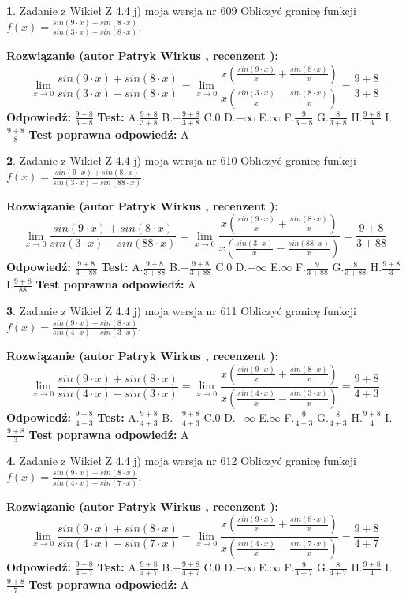 \documentclass[12pt, a4paper]{article}
\theoremstyle{definition} %
\newtheorem{zad}{}
\newcommand{\zadStart}[1]{\begin{zad}#1\newline}
\newcommand{\zadStop}{\end{zad}}
\newcommand{\rozwStart}[2]{\noindent \textbf{Rozwiązanie (autor #1 , recenzent #2): }\newline}
\newcommand{\rozwStop}{\newline}
\newcommand{\odpStart}{\noindent \textbf{Odpowiedź:}\newline}
\newcommand{\odpStop}{\newline}
\newcommand{\testStart}{\noindent \textbf{Test:}\newline}
\newcommand{\testStop}{\newline}
\newcommand{\kluczStart}{\noindent \textbf{Test poprawna odpowiedź:}\newline}
\newcommand{\kluczStop}{\newline}
\begin{document}
\zadStart{Zadanie z Wikieł Z 4.4 j) moja wersja nr 609}
Obliczyć granicę funkcji $f(x)=\frac{sin(9\cdot x) +sin(8\cdot x)}{sin(3\cdot x) -sin(8\cdot x)}$.
\zadStop
\rozwStart{Patryk Wirkus}{}
$$\lim\limits_{x\to 0}\frac{sin(9\cdot x) +sin(8\cdot x)}{sin(3\cdot x) -sin(8\cdot x)}=\lim\limits_{x\to 0}\frac{x(\frac{sin(9\cdot x)}{x}+\frac{sin(8\cdot x)}{x})}{x(\frac{sin(3\cdot x)}{x}-\frac{sin(8\cdot x)}{x})}=\frac{9+8}{3+8}$$
\rozwStop
\odpStart
$\frac{9+8}{3+8}$
\odpStop
\testStart
A.$\frac{9+8}{3+8}$
B.$-\frac{9+8}{3+8}$
C.$0$
D.$-\infty$
E.$\infty$
F.$\frac{9}{3+8}$
G.$\frac{8}{3+8}$
H.$\frac{9+8}{3}$
I.$\frac{9+8}{8}$
\testStop
\kluczStart
A
\kluczStop



\zadStart{Zadanie z Wikieł Z 4.4 j) moja wersja nr 610}
Obliczyć granicę funkcji $f(x)=\frac{sin(9\cdot x) +sin(8\cdot x)}{sin(3\cdot x) -sin(88\cdot x)}$.
\zadStop
\rozwStart{Patryk Wirkus}{}
$$\lim\limits_{x\to 0}\frac{sin(9\cdot x) +sin(8\cdot x)}{sin(3\cdot x) -sin(88\cdot x)}=\lim\limits_{x\to 0}\frac{x(\frac{sin(9\cdot x)}{x}+\frac{sin(8\cdot x)}{x})}{x(\frac{sin(3\cdot x)}{x}-\frac{sin(88\cdot x)}{x})}=\frac{9+8}{3+88}$$
\rozwStop
\odpStart
$\frac{9+8}{3+88}$
\odpStop
\testStart
A.$\frac{9+8}{3+88}$
B.$-\frac{9+8}{3+88}$
C.$0$
D.$-\infty$
E.$\infty$
F.$\frac{9}{3+88}$
G.$\frac{8}{3+88}$
H.$\frac{9+8}{3}$
I.$\frac{9+8}{88}$
\testStop
\kluczStart
A
\kluczStop



\zadStart{Zadanie z Wikieł Z 4.4 j) moja wersja nr 611}
Obliczyć granicę funkcji $f(x)=\frac{sin(9\cdot x) +sin(8\cdot x)}{sin(4\cdot x) -sin(3\cdot x)}$.
\zadStop
\rozwStart{Patryk Wirkus}{}
$$\lim\limits_{x\to 0}\frac{sin(9\cdot x) +sin(8\cdot x)}{sin(4\cdot x) -sin(3\cdot x)}=\lim\limits_{x\to 0}\frac{x(\frac{sin(9\cdot x)}{x}+\frac{sin(8\cdot x)}{x})}{x(\frac{sin(4\cdot x)}{x}-\frac{sin(3\cdot x)}{x})}=\frac{9+8}{4+3}$$
\rozwStop
\odpStart
$\frac{9+8}{4+3}$
\odpStop
\testStart
A.$\frac{9+8}{4+3}$
B.$-\frac{9+8}{4+3}$
C.$0$
D.$-\infty$
E.$\infty$
F.$\frac{9}{4+3}$
G.$\frac{8}{4+3}$
H.$\frac{9+8}{4}$
I.$\frac{9+8}{3}$
\testStop
\kluczStart
A
\kluczStop



\zadStart{Zadanie z Wikieł Z 4.4 j) moja wersja nr 612}
Obliczyć granicę funkcji $f(x)=\frac{sin(9\cdot x) +sin(8\cdot x)}{sin(4\cdot x) -sin(7\cdot x)}$.
\zadStop
\rozwStart{Patryk Wirkus}{}
$$\lim\limits_{x\to 0}\frac{sin(9\cdot x) +sin(8\cdot x)}{sin(4\cdot x) -sin(7\cdot x)}=\lim\limits_{x\to 0}\frac{x(\frac{sin(9\cdot x)}{x}+\frac{sin(8\cdot x)}{x})}{x(\frac{sin(4\cdot x)}{x}-\frac{sin(7\cdot x)}{x})}=\frac{9+8}{4+7}$$
\rozwStop
\odpStart
$\frac{9+8}{4+7}$
\odpStop
\testStart
A.$\frac{9+8}{4+7}$
B.$-\frac{9+8}{4+7}$
C.$0$
D.$-\infty$
E.$\infty$
F.$\frac{9}{4+7}$
G.$\frac{8}{4+7}$
H.$\frac{9+8}{4}$
I.$\frac{9+8}{7}$
\testStop
\kluczStart
A
\kluczStop
\end{document}
